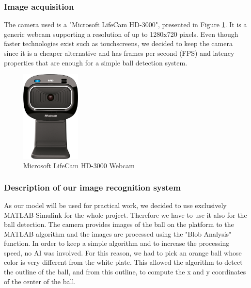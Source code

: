 \subsubsection{Image acquisition}
The camera used is a "Microsoft LifeCam HD-3000", presented in Figure \ref{Microsoft LifeCam HD-3000 Webcam}. It is a generic webcam supporting a resolution of up to 1280x720 pixels\cite{noauthor_microsoft_nodate}. Even though faster technologies exist such as touchscreens\cite{adak2015touchscreen}, we decided
to keep the camera since it is a cheaper alternative and has frames per second (FPS) and latency
properties that are enough for a simple ball detection system.\newline
\begin{center}
    \begin{figure}[ht!]
        \centering
        \includegraphics[width=3cm, keepaspectratio]{imports/MS_Lifecam.png}
        \caption{Microsoft LifeCam HD-3000 Webcam \cite{noauthor_microsoft_nodate}}
        \label{Microsoft LifeCam HD-3000 Webcam}
    \end{figure}
\end{center}
    \newpage
  \subsubsection{Description of our image recognition system}
  As our model will be used for practical work, we decided to use exclusively MATLAB Simulink for the whole project. Therefore we have to use it also for the ball detection.\newline
  The camera provides images of the ball on the platform to the MATLAB algorithm and the images are processed using the "Blob Analysis" function\cite{noauthor_statistics_nodate}. In order to keep a simple algorithm and to increase the processing speed, no AI was involved.\newline
  For this reason, we had to pick an orange ball whose color is very different from the white plate. This allowed the algorithm to detect the outline of the ball, and from this outline, to compute the x and y coordinates of the center of the ball.\newline
  

